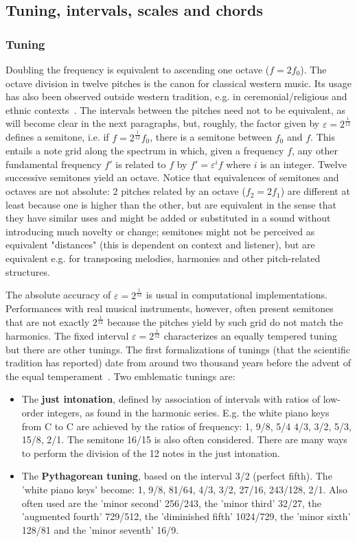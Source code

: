 \subsection{Tuning, intervals, scales and chords}\label{subsec:afinacao}
\subsubsection{Tuning}
Doubling the frequency is equivalent to ascending one octave ($f=2f_0$).
The octave division in twelve pitches is the canon for classical western music.
Its usage has also been observed
outside western tradition, e.g. in ceremonial/religious and ethnic contexts~\cite{Wisnick}.
The intervals between the pitches need not to be equivalent,
as will become clear in the next paragraphs, but, roughly,
the factor given by $\varepsilon=2^{\frac{1}{12}}$ defines a semitone,
i.e. if $f=2^{\frac{1}{12}}f_0$, there is a semitone between
$f_0$ and $f$.
This entails a note grid along the spectrum in which, given a frequency $f$,
any other fundamental frequency $f'$ is related to $f$ by $f'= \varepsilon^i f$ where $i$ is an integer.
Twelve successive semitones yield an
octave.
Notice that equivalences of semitones and octaves are not absolute:
2 pitches related by an octave ($f_2 = 2f_1$) are different at least because one is higher than the other,
but are equivalent in the sense that they have similar uses and might be added or substituted
in a sound without introducing much novelty or change;
semitones might not be perceived as equivalent "distances"
(this is dependent on context and listener),
but are equivalent e.g. for transposing melodies, harmonies
and other pitch-related structures.

The absolute accuracy of $\varepsilon=2^\frac{1}{12}$ is usual in computational implementations.
Performances with real musical instruments, however, often present semitones that are not exactly $2^{\frac{1}{12}}$
because the pitches yield by such grid do not match the harmonics.
The fixed interval $\varepsilon=2^{\frac{1}{12}}$ characterizes an equally tempered tuning but there are other tunings. The first formalizations of tunings (that the scientific tradition has reported) date from around two thousand years before the advent of the equal temperament~\cite{Roederer}.
Two emblematic tunings are:
\begin{itemize}
    \item The {\bf just intonation}, defined by association of intervals with ratios of low-order integers, as found in the harmonic series. E.g. the white piano keys from C to C are achieved by the ratios of frequency: 1, 9/8, 5/4
    4/3, 3/2, 5/3, 15/8, 2/1. The semitone 16/15 is also often considered.
		There are many ways to perform the division of the 12 notes in the just intonation.
    \item The {\bf Pythagorean tuning}, based on the interval 3/2 (perfect fifth). The 'white piano keys' become: 1, 9/8, 81/64, 4/3, 3/2, 27/16, 243/128, 2/1. Also often used are the 'minor second' 256/243, the 'minor third' 32/27, the 'augmented fourth' 729/512, the 'diminished fifth' 1024/729, the 'minor sixth' 128/81 and the 'minor seventh' 16/9. 
\end{itemize}

